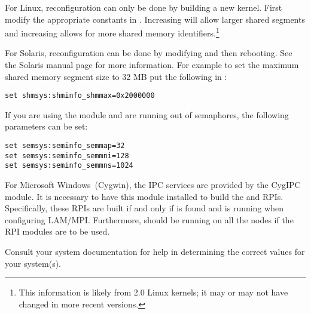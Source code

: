 For Linux, reconfiguration can only be done by building a new kernel.
First modify the appropriate constants in
.  Increasing  will
allow larger shared segments and increasing 
allows for more shared memory identifiers.\footnote{This information
  is likely from 2.0 Linux kernels; it may or may not have changed in
  more recent versions.}

For Solaris, reconfiguration can be done by modifying
 and then rebooting.  See the Solaris
 manual page for more information.
%
For example to set the maximum shared memory segment size to 32 MB put
the following in :

\lstset{style=lam-shell}
\begin{lstlisting}
set shmsys:shminfo_shmmax=0x2000000
\end{lstlisting}

If you are using the  module and are running out of
semaphores, the following parameters can be set:

\lstset{style=lam-shell}
\begin{lstlisting}
set semsys:seminfo_semmap=32
set semsys:seminfo_semmni=128
set semsys:seminfo_semmns=1024
\end{lstlisting}

For Microsoft Windows\trademark\ (Cygwin), the IPC services are provided
by the CygIPC module.  It is necessary to have this module installed 
to build the  and  RPIs.  Specifically, these RPIs 
are built if and only if  is found and 
is running when configuring LAM/MPI.  Furthermore,  should 
be running on all the nodes if the RPI modules are to be used. 

Consult your system documentation for help in determining the correct
values for your system(s).


